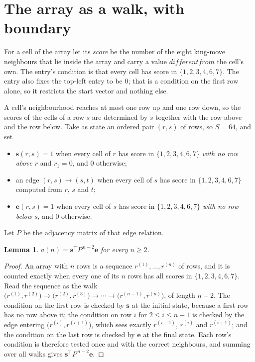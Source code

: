 \documentclass[11pt,a4paper]{article}
\theoremstyle{plain}
\newtheorem{lemma}[theorem]{Lemma}
\theoremstyle{definition}
\begin{document}
\section{The array as a walk, with boundary}

For a cell of the array let its \emph{score} be the number of the eight king-move neighbours that lie inside
the array and carry a value $different from$ the cell's own. The entry's condition is that every cell
has score in $\{1,2,3,4,6,7\}$. The entry also fixes the top-left entry to be $0$; that is a condition on the first row alone, so it restricts the start vector and nothing else.

A cell's neighbourhood reaches at most one row up and one row down, so the scores of the
cells of a row $s$ are determined by $s$ together with the row above and the row below.
Take as state an ordered pair $(r,s)$ of rows, so $S=64$, and set
\begin{itemize}
\item $\mathbf{s}(r,s)=1$ when every cell of $r$ has score in $\{1,2,3,4,6,7\}$ \emph{with no row
above $r$} and $r_1=0$, and $0$ otherwise;
\item an edge $(r,s)\to(s,t)$ when every cell of $s$ has score in $\{1,2,3,4,6,7\}$ computed from
$r$, $s$ and $t$;
\item $\mathbf{e}(r,s)=1$ when every cell of $s$ has score in $\{1,2,3,4,6,7\}$ \emph{with no row
below $s$}, and $0$ otherwise.
\end{itemize}
Let $P$ be the adjacency matrix of that edge relation.

\begin{lemma}\label{lem:walk}
$a(n)=\mathbf{s}^{\!\top}P^{\,n-2}\mathbf{e}$ for every $n\ge2$.
\end{lemma}

\begin{proof}
An array with $n$ rows is a sequence $r^{(1)},\dots,r^{(n)}$ of rows, and it is counted
exactly when every one of its $n$ rows has all scores in $\{1,2,3,4,6,7\}$. Read the sequence as the
walk $\bigl(r^{(1)},r^{(2)}\bigr)\to\bigl(r^{(2)},r^{(3)}\bigr)\to\cdots\to
\bigl(r^{(n-1)},r^{(n)}\bigr)$, of length $n-2$. The condition on the first row is
checked by $\mathbf{s}$ at the initial state, because a first row has no row above it; the
condition on row $i$ for $2\le i\le n-1$ is checked by the edge entering
$\bigl(r^{(i)},r^{(i+1)}\bigr)$, which sees exactly $r^{(i-1)}$, $r^{(i)}$ and
$r^{(i+1)}$; and the condition on the last row is checked by $\mathbf{e}$ at the final
state. Each row's condition is therefore tested once and with the correct neighbours, and
summing over all walks gives $\mathbf{s}^{\!\top}P^{\,n-2}\mathbf{e}$.
\end{proof}
\end{document}
